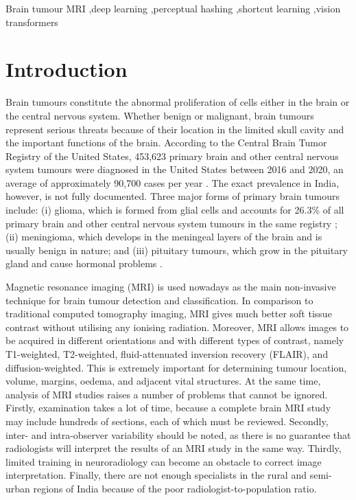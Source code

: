 \documentclass[final,3p,times,number]{elsarticle}
\begin{document}
\begin{frontmatter}
\begin{keyword}
Brain tumour MRI \sep deep learning \sep perceptual hashing \sep shortcut learning \sep vision transformers
\end{keyword}

\end{frontmatter}

\section{Introduction}
\label{sec:intro}

Brain tumours constitute the abnormal proliferation of cells either in the brain or the central nervous system. Whether benign or malignant, brain tumours represent serious threats because of their location in the limited skull cavity and the important functions of the brain. According to the Central Brain Tumor Registry of the United States, 453,623 primary brain and other central nervous system tumours were diagnosed in the United States between 2016 and 2020, an average of approximately 90,700 cases per year \cite{cbtrus}. The exact prevalence in India, however, is not fully documented. Three major forms of primary brain tumours include: (i) glioma, which is formed from glial cells and accounts for 26.3\% of all primary brain and other central nervous system tumours in the same registry \cite{cbtrus}; (ii) meningioma, which develops in the meningeal layers of the brain and is usually benign in nature; and (iii) pituitary tumours, which grow in the pituitary gland and cause hormonal problems \cite{ref2}.

Magnetic resonance imaging (MRI) is used nowadays as the main non-invasive technique for brain tumour detection and classification. In comparison to traditional computed tomography imaging, MRI gives much better soft tissue contrast without utilising any ionising radiation. Moreover, MRI allows images to be acquired in different orientations and with different types of contrast, namely T1-weighted, T2-weighted, fluid-attenuated inversion recovery (FLAIR), and diffusion-weighted. This is extremely important for determining tumour location, volume, margins, oedema, and adjacent vital structures. At the same time, analysis of MRI studies raises a number of problems that cannot be ignored. Firstly, examination takes a lot of time, because a complete brain MRI study may include hundreds of sections, each of which must be reviewed. Secondly, inter- and intra-observer variability should be noted, as there is no guarantee that radiologists will interpret the results of an MRI study in the same way. Thirdly, limited training in neuroradiology can become an obstacle to correct image interpretation. Finally, there are not enough specialists in the rural and semi-urban regions of India because of the poor radiologist-to-population ratio.
\end{document}

